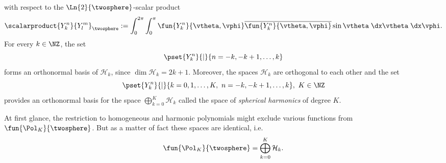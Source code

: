 with respect to the $\Ln{2}{\twosphere}$-scalar product 
\begin{equation}
  \nonumber
  \scalarproduct{Y_{k}^n}{Y_{l}^m}_{\twosphere} := \int_{0}^{2\pi} \int_{0}^{\pi} \fun{Y_{k}^n}{\vtheta,\vphi} \overline{\fun{Y_{k}^n}{\vtheta,\vphi}} \sin \vtheta \; \dx \vtheta \; \dx \vphi.
\end{equation}
For every $k \in \NZ$, the set
\begin{equation}
  \nonumber
  \pset{Y_{k}^n}{|}{n = -k,-k+1,\ldots,k}
\end{equation}
forms an orthonormal basis of $ \mathcal{H}_k$, since $\dim \mathcal{H}_k =
2k+1$. Moreover, the spaces $\mathcal{H}_k$ are orthogonal
to each other and the set 
$$\pset{Y_{k}^n}{|}{k = 0,1,\ldots,K,\ n = -k,-k+1,\ldots,k},\ K \in \NZ$$ 
provides an orthonormal basis for the space $\bigoplus_{k=0}^{K}\mathcal{H}_k$ called
the space of \emph{spherical harmonics} of degree $K$.

At first glance, the restriction to homogeneous and harmonic polynomials
might exclude various functions from $\fun{\Pol_K}{\twosphere}$. But as a 
matter of fact these spaces are identical, i.e. 
\begin{equation}
  \nonumber
    \fun{\Pol_K}{\twosphere} = \bigoplus_{k=0}^{K}\mathcal{H}_k.
\end{equation}

